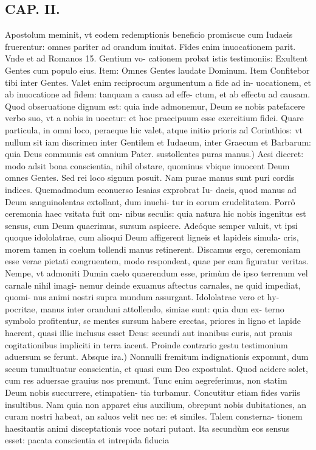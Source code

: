\documentclass{article}
\begin{document}
\begin{pages}
\section*{CAP. II. }
\marginpar{[ p.25 ]}\pstart Apostolum meminit, vt eodem redemptionis beneficio promiscue cum Iudaeis fruerentur: omnes pariter ad orandum inuitat. Fides enim inuocationem parit. Vnde et ad Romanos 15. Gentium vo- cationem probat istis testimoniis: Exultent Gentes cum populo eius. Item: Omnes Gentes laudate Dominum. Item Confitebor tibi inter Gentes. Valet enim reciprocum argumentum a fide ad in- uocationem, et ab inuocatione ad fidem: tanquam a causa ad effe- ctum, et ab effectu ad causam. Quod obseruatione dignum est: quia inde admonemur, Deum se nobis patefacere verbo suo, vt a nobis in uocetur: et hoc praecipuum esse exercitium fidei. Quare particula, in omni loco, peraeque hic valet, atque initio prioris ad Corinthios: vt nullum sit iam discrimen inter Gentilem et Iudaeum, inter Graecum et Barbarum: quia Deus communis est omnium Pater.  \pend\pstart sustollentes puras manus.) Acsi diceret: modo adsit bona conscientia, nihil obstare, quominus vbique inuocent Deum omnes Gentes. Sed rei loco signum posuit. Nam purae manus sunt puri cordis indices. Quemadmodum econuerso Iesaias exprobrat Iu- daeis, quod manus ad Deum sanguinolentas extollant, dum inuehi- tur in eorum crudelitatem. Porrô ceremonia haec vsitata fuit om- nibus seculis: quia natura hic nobis ingenitus est sensus, cum Deum quaerimus, sursum aspicere. Adeóque semper valuit, vt ipsi quoque idololatrae, cum alioqui Deum affigerent ligneis et lapideis simula- cris, morem tamen in coelum tollendi manus retinerent. Discamus ergo, ceremoniam esse verae pietati congruentem, modo respondeat, quae per eam figuratur veritas. Nempe, vt admoniti Dumin caelo quaerendum esse, primùm de ipso terrenum vel carnale nihil imagi- nemur deinde exuamus aftectus carnales, ne quid impediat, quomi- nus animi nostri supra mundum assurgant. Idololatrae vero et hy- pocritae, manus inter oranduni attollendo, simiae sunt: quia dum ex- terno symbolo profitentur, se mentes sursum habere erectas, priores in ligno et lapide haerent, quasi illic inclusus esset Deus: secundi aut inanibus curis, aut prauis cogitationibus impliciti in terra iacent. Proinde contrario gestu testimonium aduersum se ferunt.  \pend\pstart Absque ira.) Nonnulli fremitum indignationis exponunt, dum secum tumultuatur conscientia, et quasi cum Deo expostulat. Quod acidere solet, cum res aduersae grauius nos premunt. Tunc enim aegreferimus, non statim Deum nobis succurrere, etimpatien- tia turbamur. Concutitur etiam fides variis insultibus. Nam quia non apparet eius auxilium, obrepunt nobis dubitationes, an curam nostri habeat, an saluos velit nec ne: et similes. Talem consterna- tionem haesitantis animi disceptationis voce notari putant. Ita secundùm eos sensus esset: pacata conscientia et intrepida fiducia  \pend

\end{pages}
\end{document}

